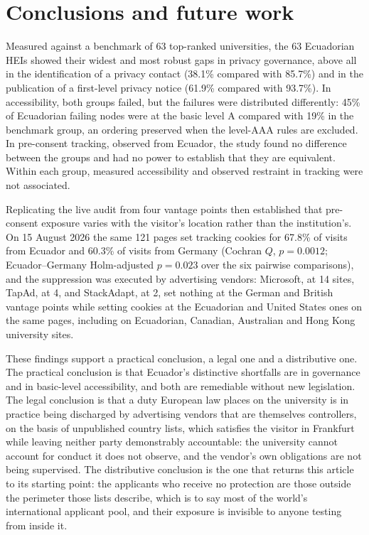 \documentclass[pdflatex,sn-basic,Numbered,iicol]{sn-jnl}
\theoremstyle{thmstyleone}
\theoremstyle{thmstyletwo}
\theoremstyle{thmstylethree}
\begin{document}
\section{Conclusions and future work}\label{sec:conclusions}

Measured against a benchmark of 63 top-ranked universities, the 63 Ecuadorian HEIs showed their widest and most robust gaps in privacy governance, above all in the identification of a privacy contact (38.1\% compared with 85.7\%) and in the publication of a first-level privacy notice (61.9\% compared with 93.7\%). In accessibility, both groups failed, but the failures were distributed differently: 45\% of Ecuadorian failing nodes were at the basic level A compared with 19\% in the benchmark group, an ordering preserved when the level-AAA rules are excluded. In pre-consent tracking, observed from Ecuador, the study found no difference between the groups and had no power to establish that they are equivalent. Within each group, measured accessibility and observed restraint in tracking were not associated.

Replicating the live audit from four vantage points then established that pre-consent exposure varies with the visitor's location rather than the institution's. On 15 August 2026 the same 121 pages set tracking cookies for 67.8\% of visits from Ecuador and 60.3\% of visits from Germany (Cochran $Q$, $p=0.0012$; Ecuador--Germany Holm-adjusted $p=0.023$ over the six pairwise comparisons), and the suppression was executed by advertising vendors: Microsoft, at 14 sites, TapAd, at 4, and StackAdapt, at 2, set nothing at the German and British vantage points while setting cookies at the Ecuadorian and United States ones on the same pages, including on Ecuadorian, Canadian, Australian and Hong Kong university sites.

These findings support a practical conclusion, a legal one and a distributive one. The practical conclusion is that Ecuador's distinctive shortfalls are in governance and in basic-level accessibility, and both are remediable without new legislation. The legal conclusion is that a duty European law places on the university is in practice being discharged by advertising vendors that are themselves controllers, on the basis of unpublished country lists, which satisfies the visitor in Frankfurt while leaving neither party demonstrably accountable: the university cannot account for conduct it does not observe, and the vendor's own obligations are not being supervised. The distributive conclusion is the one that returns this article to its starting point: the applicants who receive no protection are those outside the perimeter those lists describe, which is to say most of the world's international applicant pool, and their exposure is invisible to anyone testing from inside it.
\end{document}

